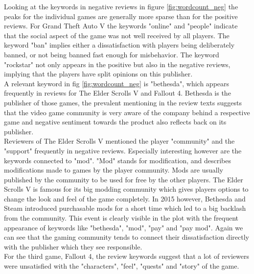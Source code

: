 \documentclass{article}
\theoremstyle{plain}
\theoremstyle{definition}
\theoremstyle{remark}
\begin{document}
Looking at the keywords in negative reviews in figure \ref{fig:wordcount_neg} the peaks for the individual games are generally more sparse than for the positive reviews.
For Grand Theft Auto V the keywords "online" and "people" indicate that the social aspect of the game was not well received by all players. The keyword "ban" implies either a dissatisfaction with players being deliberately banned, or not being banned fast enough for misbehavior. The keyword "rockstar" not only appears in the positive but also in the negative reviews, implying that the players have split opinions on this publisher.\\
A relevant keyword in fig \ref{fig:wordcount_neg} is "bethesda", which appears frequently in reviews for The Elder Scrolls V and Fallout 4. Bethesda is the publisher of those games, the prevalent mentioning in the review texts suggests that the video game community is very aware of the company behind a respective game and negative sentiment towards the product also reflects back on its publisher.\\
Reviewers of The Elder Scrolls V mentioned the player "community" and the "support" frequently in negative reviews. Especially interesting however are the keywords connected to "mod". "Mod" stands for modification, and describes modifications made to games by the player community. Mods are usually published by the community to be used for free by the other players. The Elder Scrolls V is famous for its big modding community which gives players options to change the look and feel of the game completely. In 2015 however, Bethesda and Steam introduced purchasable mods for a short time \cite{paid_mods} which led to a big backlash from the community. This event is clearly visible in the plot with the frequent appearance of keywords like "bethesda", "mod", "pay" and "pay mod". Again we can see that the gaming community tends to connect their dissatisfaction directly with the publisher which they see responsible.\\
For the third game, Fallout 4, the review keywords suggest that a lot of reviewers were unsatisfied with the "characters", "feel", "quests" and "story" of the game.
\end{document}
